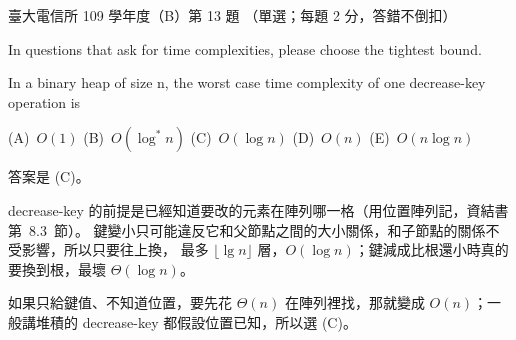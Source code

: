 \begin{pastexam}[label={px:ntu-109-comm-dsa-13}]{臺大電信所 109 學年度（B）第 13 題}
（單選；每題 2 分，答錯不倒扣）

In questions that ask for time complexities, please choose the tightest bound.

In a binary heap of size n, the worst case time complexity of one decrease-key operation is

(A)~$O(1)$ \qquad (B)~$O(\log^* n)$ \qquad (C)~$O(\log n)$ \qquad (D)~$O(n)$ \qquad (E)~$O(n\log n)$
\end{pastexam}

\begin{pastsoln}
答案是 (C)。

decrease-key 的前提是已經知道要改的元素在陣列哪一格（用位置陣列記，資結書第~8.3~節）。
鍵變小只可能違反它和父節點之間的大小關係，和子節點的關係不受影響，所以只要往上換，
最多 $\lfloor \lg n \rfloor$ 層，$O(\log n)$；鍵減成比根還小時真的要換到根，最壞
$\Theta(\log n)$。

如果只給鍵值、不知道位置，要先花 $\Theta(n)$ 在陣列裡找，那就變成 $O(n)$；一般講堆積的
decrease-key 都假設位置已知，所以選 (C)。
\end{pastsoln}
